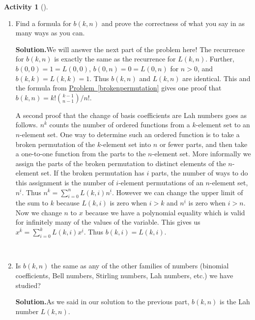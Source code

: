 \documentclass[10pt,]{book}
\theoremstyle{plain}
\theoremstyle{definition}
\newtheorem{activity}[project]{Activity}
\numberwithin{equation}{chapter}
\begin{document}
\begin{activity}[]
\begin{enumerate}[label=(\alph*)]
~\par
\item Find a formula for \(b(k,n)\) and prove the correctness of what you say in as many ways as you can.%
\par\medskip\noindent%
\textbf{Solution.}\quad We will answer the next part of the problem here! The recurrence for \(b(k,n)\) is exactly the same as the recurrence for \(L(k,n)\). Further, \(b(0,0)=1=L(0,0)\), \(b(0,n) = 0=L(0,n)\) for \(n>0\), and \(b(k,k)=L(k,k) =1\). Thus \(b(k,n)\) and \(L(k,n)\) are identical. This and the formula from \hyperref[brokenpermutation]{Problem~\ref{brokenpermutation}} gives one proof that \(b(k,n)=k!\binom{k-1}{n-1}/n!\).%
\par
A second proof that the change of basis coefficients are Lah numbers goes as follows. \(n^{\overline{k}}\) counts the number of ordered functions from a \(k\)-element set to an \(n\)-element set. One way to determine such an ordered function is to take a broken permutation of the \(k\)-element set into \(n\) or fewer parts, and then take a one-to-one function from the parts to the \(n\)-element set. More informally we assign the parts of the broken permutation to distinct elements of the \(n\)-element set. If the broken permutation has \(i\) parts, the number of ways to do this assignment is the number of \(i\)-element permutations of an \(n\)-element set, \(n^{\underline{i}}\). Thus \(n^{\overline{k}}=\sum_{i=0}^n L(k,i)n^{\underline{i}}\). However we can change the upper limit of the sum to \(k\) because \(L(k,i)\) is zero when \(i>k\) and \(n^{\underline{i}}\) is zero when \(i>n\). Now we change \(n\) to \(x\) because we have a polynomial equality which is valid for infinitely many of the values of the variable. This gives us \(x^{\overline{k}}=\sum_{i=0}^k L(k,i)x^{\underline{i}}\). Thus \(b(k,i) =
L(k,i)\).%

~\par
\item Is \(b(k,n)\) the same as any of the other families of numbers (binomial coefficients, Bell numbers, Stirling numbers, Lah numbers, etc.) we have studied?%
\par\medskip\noindent%
\textbf{Solution.}\quad As we said in our solution to the previous part, \(b(k,n)\) is the Lah number \(L(k,n)\).%


\end{enumerate}
\end{activity}
\end{document}
